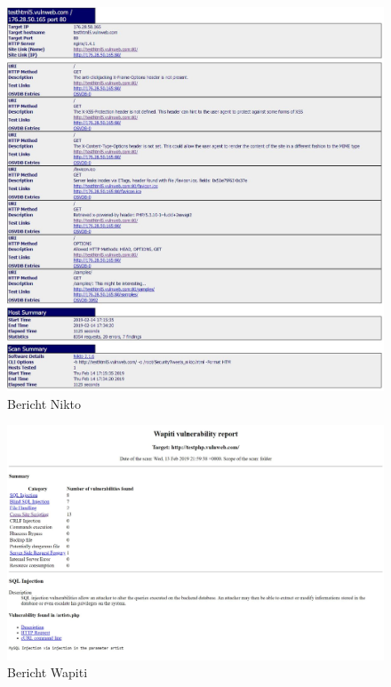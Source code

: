 \documentclass[12pt,oneside,a4paper,parskip,pointlessnumbers]{scrbook}
\begin{document}
  \begin{figure}[htb!]
    \centering
      \includegraphics[width=1\textwidth]{Images/ScrNikto}
    \caption[Bericht Nikto]{Bericht Nikto}
  \end{figure}
  \begin{figure}[htb!]
    \centering
      \includegraphics[width=1\textwidth]{Images/ScrWapiti}
    \caption[Bericht Wapiti]{Bericht Wapiti}
  \end{figure}
\end{document}
